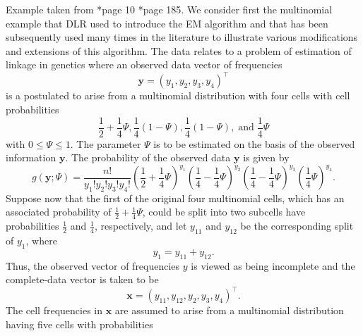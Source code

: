 \begin{exam} \label{exam: em_mutlinomial_eg}
    Example taken from \cite{McLachlanGeoffreyJohn2008TEaa}*{page 10} \cite{KroeseDirkP2013SMaC}*{page 185}. We consider first the multinomial example that DLR used to introduce the EM algorithm and that has been subsequently used many times in the literature to illustrate various modifications and extensions of this algorithm. The data relates to a problem of estimation of linkage in genetics where an observed data vector of frequencies
    \begin{equation*}
        \bm{y} = (y_1 , y_2 , y_3 , y_4)^{\intercal}
    \end{equation*}
    is a postulated to arise from a multinomial distribution with four cells with cell probabilities
    \begin{equation*}
        \frac{1}{2} + \frac{1}{4} \Psi , \frac{1}{4} \left( 1 - \Psi \right) , \frac{1}{4} \left( 1 - \Psi \right), \; \text{and} \; \frac{1}{4} \Psi
    \end{equation*}
    with $0 \leq \Psi \leq 1$. The parameter $\Psi$ is to be estimated on the basis of the observed information $\bm{y}$. The probability of the observed data $\bm{y}$ is given by
    \begin{equation*}
        g (\bm{y} ; \Psi) = \frac{n!}{y_1 ! y_2 ! y_3 ! y_4 !} \left( \frac{1}{2} + \frac{1}{4} \Psi \right)^{y_1} \left( \frac{1}{4} - \frac{1}{4} \Psi \right)^{y_2} \left( \frac{1}{4} - \frac{1}{4} \Psi \right)^{y_3} \left( \frac{1}{4} \Psi \right)^{y_4}.
    \end{equation*}
    Suppose now that the first of the original four multinomial cells, which has an associated probability of $\frac{1}{2} + \frac{1}{4} \Psi$, could be split into two subcells have probabilities $\frac{1}{2}$ and $\frac{1}{4}$, respectively, and let $y_{11}$ and $y_{12}$ be the corresponding split of $y_1$, where
    \begin{equation*}
        y_1 = y_{11} + y_{12}.
    \end{equation*}
    Thus, the observed vector of frequencies $y$ is viewed as being incomplete and the complete-data vector is taken to be
    \begin{equation*}
        \bm{x} = (y_{11} , y_{12} , y_{2} , y_{3} , y_{4})^{\intercal}.
    \end{equation*}
    The cell frequencies in $\bm{x}$ are assumed to arise from a multinomial distribution having five cells with probabilities
    \begin{equation*}

\end{equation*}
\end{exam}
